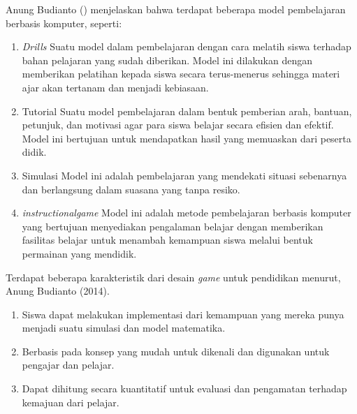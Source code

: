 	Anung Budianto (\citeyear{paper.anung}) menjelaskan bahwa terdapat beberapa model pembelajaran berbasis komputer, seperti:
	\begin{enumerate}
		\item \textit{Drills}
			\subitem Suatu model dalam pembelajaran dengan cara melatih siswa terhadap bahan pelajaran yang sudah diberikan. Model ini dilakukan dengan memberikan pelatihan kepada siswa secara terus-menerus sehingga materi ajar akan tertanam dan menjadi kebiasaan.
		\item Tutorial
			\subitem Suatu model pembelajaran dalam bentuk pemberian arah, bantuan, petunjuk, dan motivasi agar para siswa belajar secara efisien dan efektif. Model ini bertujuan untuk mendapatkan hasil yang memuaskan dari peserta didik.
		\item Simulasi
			\subitem Model ini adalah pembelajaran yang mendekati situasi sebenarnya dan berlangsung dalam suasana yang tanpa resiko.
		\item \textit{instructionalgame}
			\subitem Model ini adalah metode pembelajaran berbasis komputer yang bertujuan menyediakan pengalaman belajar dengan memberikan fasilitas belajar untuk menambah kemampuan siswa melalui bentuk permainan yang mendidik.
	\end{enumerate}
	
	Terdapat beberapa karakteristik dari desain \textit{game} untuk pendidikan menurut, Anung Budianto (2014).
	\begin{enumerate}
		\item Siswa dapat melakukan implementasi dari kemampuan yang mereka punya menjadi suatu simulasi dan model matematika.
		\item Berbasis pada konsep yang mudah untuk dikenali dan digunakan untuk pengajar dan pelajar.
		\item Dapat dihitung secara kuantitatif untuk evaluasi dan pengamatan terhadap kemajuan dari pelajar.
	\end{enumerate}
	
